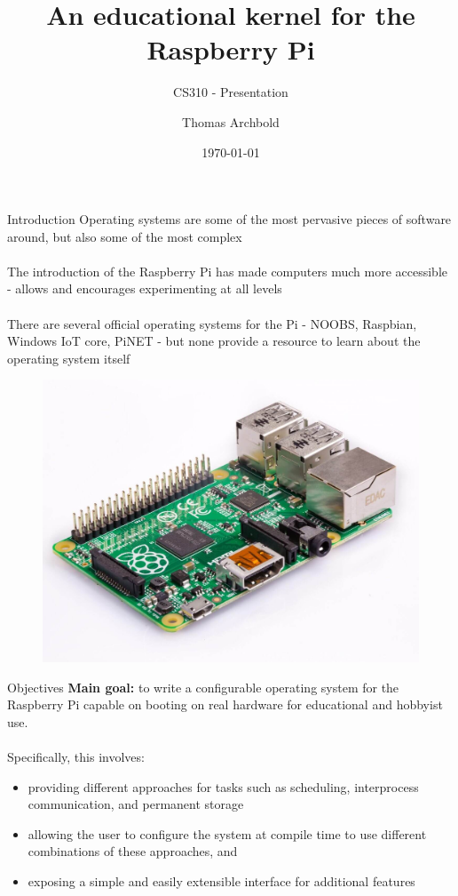 \documentclass{beamer}
\title{An educational kernel for the Raspberry Pi}
\subtitle{CS310 - Presentation}
\author{Thomas Archbold}
\date{\today}
\begin{document}
\begin{frame}
    \titlepage
\end{frame}

\begin{frame}{Introduction}
\centering
    Operating systems are some of the most pervasive pieces of software around,
    but also some of the most complex \\~\\

    The introduction of the Raspberry Pi has made computers much more accessible
    - allows and encourages experimenting at all levels \\~\\

    There are several official operating systems for the Pi - NOOBS, Raspbian,
    Windows IoT core, PiNET - but none provide a resource to learn about the
    operating system itself

    \begin{figure}
        \includegraphics[width=0.4\linewidth]{raspi1B.jpg}
    \end{figure}
\end{frame}

\begin{frame}{Objectives}
    \textbf{Main goal:}
    to write a configurable operating system for the Raspberry Pi capable on
    booting on real hardware for educational and hobbyist use. \\~\\

    Specifically, this involves:
    \begin{itemize}
        \item providing different approaches for tasks such as scheduling,
            interprocess communication, and permanent storage
        \item allowing the user to configure the system at compile time to use
            different combinations of these approaches, and
        \item exposing a simple and easily extensible interface for additional
            features
    \end{itemize}
\end{frame}
\end{document}
